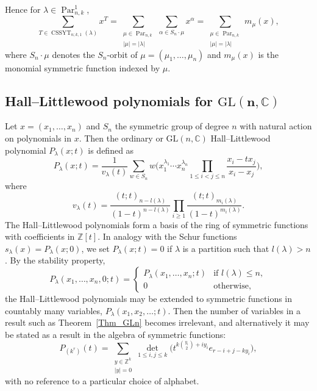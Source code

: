 \documentclass[pdftex]{sigma}
\numberwithin{equation}{section}
\renewcommand{\leq}{\leqslant}
\renewcommand{\geq}{\geqslant}
\DeclareMathOperator{\Par}{Par}
\DeclareMathOperator{\CSSYT}{CSSYT}
\newcommand{\abs}[1]{\vert#1\vert}
\newcommand{\la}{\lambda}
\begin{document}
Hence for $\la\in\Par_{n,k}^1$,
\begin{equation}
\sum_{T\in\CSSYT_{n;k,1}(\la)} x^T =
\sum_{\substack{\mu\in\Par_{n,k}\\[1pt]
\abs{\mu}=\abs{\la}}} \sum_{\alpha\in S_n\cdot\mu} x^{\alpha}
=\sum_{\substack{\mu\in\Par_{n,k}\\[1pt]\abs{\mu}=\abs{\la}}}
m_{\mu}(x), \label{Eq_een}
\end{equation}
where $S_n\cdot\mu$ denotes the $S_n$-orbit of $\mu=(\mu_1,\dots,\mu_n)$
and $m_{\mu}(x)$ is the monomial symmetric function indexed by $\mu$.


\subsection[Hall--Littlewood polynomials for GL(n,C)]{Hall--Littlewood polynomials for $\boldsymbol{\mathrm{GL}(n,\mathbb{C})}$}
\label{Sec_HL-Gln}

Let $x=(x_1,\dots,x_n)$ and $S_n$ the symmetric group of degree $n$
with natural action on polynomials in $x$.
Then the ordinary or $\mathrm{GL}(n,\mathbb{C})$ Hall--Littlewood
polynomial $P_{\la}(x;t)$ is defined as \cite{Macdonald95}
\begin{equation*}%
P_{\la}(x;t)=\frac{1}{v_{\la}(t)}
\sum_{w\in S_n} w\biggl(x_1^{\la_1}\cdots x_n^{\la_n}
\prod_{1\leq i<j\leq n}\frac{x_i-tx_j}{x_i-x_j}\biggr),
\end{equation*}
where
\[
v_{\la}(t)=
\frac{(t;t)_{n-l(\la)}}{(1-t)^{n-l(\la)}}\prod_{i\geq 1}
\frac{(t;t)_{m_i(\la)}}{(1-t)^{m_i(\la)}}.
\]
The Hall--Littlewood polynomials \smash{$\{P_{\la}(x;t)\}_{l(\la)\leq n}$}
form a basis of the ring of symmetric functions with coefficients
in $\mathbb{Z}[t]$.
In analogy with the Schur functions $s_{\la}(x)=P_{\la}(x;0)$, we set
$P_{\la}(x;t)=0$ if $\la$ is a partition such that $l(\la)>n$.
By the stability property,
\[
P_{\la}(x_1,\dots,x_n,0;t)=\begin{cases}
P_{\la}(x_1,\dots,x_n;t) & \text{if $l(\la)\leq n$}, \\
0 & \text{otherwise},
\end{cases}
\]
the Hall--Littlewood polynomials may be extended to symmetric functions
in countably many variables, $P_{\la}(x_1,x_2,\dots;t)$.
Then the number of variables in a result such as Theorem~\ref{Thm_GLn}
becomes irrelevant, and alternatively it may be stated as a result in
the algebra of symmetric functions:
\begin{equation}\label{Eq_Thm_GLn2}
P_{(k^r)}(t)=
\sum_{\substack{y\in\mathbb{Z}^k\\[1pt] \abs{y}=0}}
\det_{1\leq i,j\leq k}
\bigl(t^{k\binom{y_i}{2}+iy_i} e_{r-i+j-ky_i} \bigr),
\end{equation}
with no reference to a particular choice of alphabet.
\end{document}
